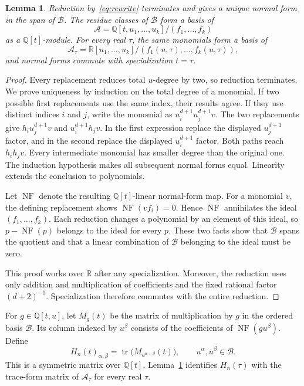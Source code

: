\documentclass[11pt,leqno]{amsart}
\newtheorem{lemma}[theorem]{Lemma}
\theoremstyle{definition}
\theoremstyle{remark}
\numberwithin{equation}{section}
\newcommand{\R}{\mathbb R}
\newcommand{\Q}{\mathbb Q}
\newcommand{\B}{\mathcal B}
\newcommand{\NF}{\operatorname{NF}}
\newcommand{\tr}{\operatorname{tr}}
\begin{document}
\begin{lemma}\label{lem:basis}
Reduction by~\eqref{eq:rewrite} terminates and gives a unique normal form
in the span of $\B$. The residue classes of $\B$ form a basis of
\begin{equation}\label{eq:quotient}
 \mathcal A=\Q[t,u_1,\ldots,u_k]/(f_1,\ldots,f_k)
\end{equation}
as a $\Q[t]$-module. For every real $\tau$, the same monomials form a
basis of
\[
 \mathcal A_\tau=\R[u_1,\ldots,u_k]/(f_1(u,\tau),\ldots,f_k(u,\tau)),
\]
and normal forms commute with specialization $t=\tau$.
\end{lemma}

\begin{proof}
Every replacement reduces total $u$-degree by two, so reduction
terminates. We prove uniqueness by induction on the total degree
of a monomial. If two possible first replacements use the same index,
their results agree. If they use distinct indices $i$ and $j$, write the
monomial as $u_i^{d+1}u_j^{d+1}v$. The two replacements give
$h_i u_j^{d+1}v$ and $u_i^{d+1}h_jv$. In the first expression replace
the displayed $u_j^{d+1}$ factor, and in the second replace the displayed
$u_i^{d+1}$ factor. Both paths reach $h_i h_jv$.
Every intermediate monomial has smaller degree than the original one.
The induction hypothesis makes all subsequent normal forms equal.
Linearity extends the conclusion to polynomials.

Let $\NF$ denote the resulting $\Q[t]$-linear normal-form map.
For a monomial $v$, the defining replacement shows
$\NF(vf_i)=0$. Hence $\NF$ annihilates the ideal $(f_1,\ldots,f_k)$.
Each reduction changes a polynomial by an element of this ideal, so
$p-\NF(p)$ belongs to the ideal for every $p$. These two facts show
that $\B$ spans the quotient and that a linear combination of $\B$
belonging to the ideal must be zero.

This proof works over $\R$ after any specialization. Moreover, the
reduction uses only addition and multiplication of coefficients and
the fixed rational factor $(d+2)^{-1}$. Specialization therefore commutes
with the entire reduction.
\end{proof}

For $g\in\Q[t,u]$, let $M_g(t)$ be the matrix of multiplication by $g$
in the ordered basis $\B$. Its column indexed by $u^\beta$ consists of
the coefficients of $\NF(gu^\beta)$. Define
\begin{equation}\label{eq:H}
 H_n(t)_{\alpha,\beta}
 =\tr\bigl(M_{u^{\alpha+\beta}}(t)\bigr),
 \qquad u^\alpha,u^\beta\in\B.
\end{equation}
This is a symmetric matrix over $\Q[t]$. Lemma~\ref{lem:basis} identifies
$H_n(\tau)$ with the trace-form matrix of $\mathcal A_\tau$ for every
real $\tau$.
\end{document}
